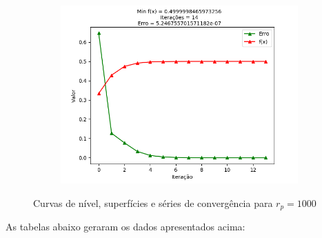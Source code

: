 \documentclass[a4paper, 12pt]{article}
\begin{document}
\begin{figure}[H]
\begin{subfigure}{0.3\textwidth}
  \includegraphics[width=\linewidth]{1/A/RP1/convergencia.png}
\end{subfigure}
\caption{Curvas de nível, superfícies e séries de convergência para $r_p = 1000$}
\label{fig:Q1ARP1000}
\end{figure}

As tabelas abaixo geraram os dados apresentados acima:
\end{document}
